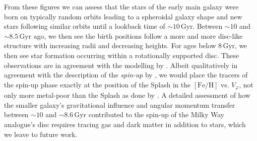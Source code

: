 \documentclass[fleqn,usenatbib]{mnras}
\begin{document}
From these figures we can assess that the stars of the early main galaxy were born on typically random orbits leading to a spheroidal galaxy shape and new stars following similar orbits until a lookback time of $\sim 10\,\mathrm{Gyr}$. Between $\sim10$ and $\sim 8.5\,\mathrm{Gyr}$ ago, we then see the birth positions follow a more and more disc-like structure with increasing radii and decreasing heights. For ages below $8\,\mathrm{Gyr}$, we then see star formation occurring within a rotationally supported disc. These observations are in agreement with the modelling by \citet{MCM2013}. Albeit qualitatively in agreement with the description of the \textit{spin-up} by \citet{Belokurov2022}, we would place the tracers of the spin-up phase exactly at the position of the Splash in the $\mathrm{[Fe/H]}$ vs. $V_\varphi$, not only more metal-poor than the Splash as done by \citet[][see their Fig.~5b]{Belokurov2022}. A detailed assessment of how the smaller galaxy’s gravitational influence and angular momentum transfer between $\sim10$ and $\sim8.6\,\mathrm{Gyr}$ contributed to the spin-up of the Milky Way analogue’s disc requires tracing gas and dark matter in addition to stars, which we leave to future work.
\end{document}
